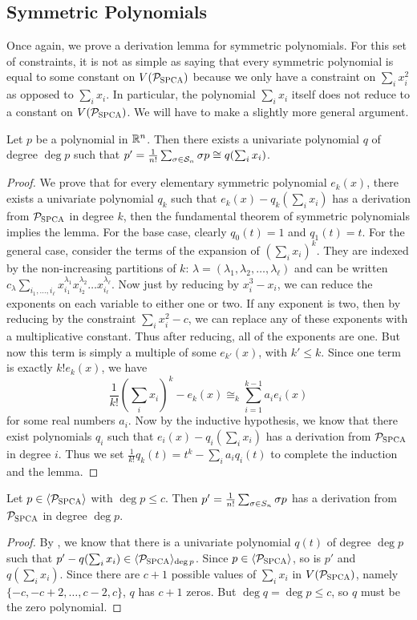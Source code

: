 \subsection{Symmetric Polynomials}
Once again, we prove a derivation lemma for symmetric polynomials. For this set of constraints, it is not as simple as saying that every symmetric polynomial is equal to some constant on $V(\mathcal P_{\textsc{SPCA}})$ because we only have a constraint on $\sum_i x_i^2$ as opposed to $\sum_i x_i$. In particular, the polynomial $\sum_i x_i$ itself does not reduce to a constant on $V(\mathcal P_{\textsc{SPCA}})$. We will have to make a slightly more general argument.
\begin{lemma}\label{lem:bpca-symmetric}
Let $p$ be a polynomial in $\mathbb R^n$. Then there exists a univariate polynomial $q$ of degree $\deg p$ such that $p' = \frac{1}{n!}\sum_{\sigma \in \mathcal S_n} \sigma p \cong q(\sum_i x_i)$.
\end{lemma}
\begin{proof}
We prove that for every elementary symmetric polynomial $e_k(x)$, there exists a univariate polynomial $q_k$ such that $e_k(x) - q_k(\sum_i x_i)$ has a derivation from $\mathcal P_{\textsc{SPCA}}$ in degree $k$, then the fundamental theorem of symmetric polynomials implies the lemma. For the base case, clearly $q_0(t) = 1$ and $q_1(t) = t$. For the general case, consider the terms of the expansion of $\left(\sum_i x_i\right)^k$. They are indexed by the non-increasing partitions of $k$: $\lambda = (\lambda_1, \lambda_2, \dots, \lambda_\ell)$ and can be written $c_\lambda \sum_{i_1,\dots,i_\ell} x_{i_1}^{\lambda_1} x_{i_2}^{\lambda_2} \dots x_{i_\ell}^{\lambda_\ell}$. Now just by reducing by $x_i^3 - x_i$, we can reduce the exponents on each variable to either one or two. If any exponent is two, then by reducing by the constraint $\sum_i x_i^2 - c$, we can replace any of these exponents with a multiplicative constant. Thus after reducing, all of the exponents are one. But now this term is simply a multiple of some $e_{k'}(x)$, with $k' \leq k$. Since one term is exactly $k!e_k(x)$, we have
\[\frac{1}{k!}\left(\sum_i x_i\right)^k - e_k(x) \cong_k \sum_{i=1}^{k-1} a_i e_i(x)\]
for some real numbers $a_i$. Now by the inductive hypothesis, we know that there exist polynomials $q_i$ such that $e_i(x) - q_i(\sum_i x_i)$ has a derivation from $\mathcal P_{\textsc{SPCA}}$ in degree $i$. Thus we set $\frac{1}{k!}q_k(t) = t^k - \sum_i a_i q_i(t)$ to complete the induction and the lemma.
\end{proof}
\begin{corollary}
Let $p \in \langle \mathcal P_{\textsc{SPCA}} \rangle$ with $\deg p \leq c$. Then $p' = \frac{1}{n!}\sum_{\sigma \in S_{n}} \sigma p$ has a derivation from $\mathcal P_{\textsc{SPCA}}$ in degree $\deg p$. 
\end{corollary}
\begin{proof}
By , we know that there is a univariate polynomial $q(t)$ of degree $\deg p$ such that $p' - q(\sum_i x_i) \in \langle \mathcal P_{\textsc{SPCA}} \rangle_{\deg p}$. Since $p \in \langle \mathcal P_{\textsc{SPCA}} \rangle$, so is $p'$ and $q(\sum_i x_i)$. Since there are $c+1$ possible values of $\sum_i x_i$ in $V(\mathcal P_{\textsc{SPCA}})$, namely $\{-c, -c+2, \dots, c-2, c\}$, $q$ has $c+1$ zeros. But $\deg q = \deg p \leq c$, so $q$ must be the zero polynomial.
\end{proof}

